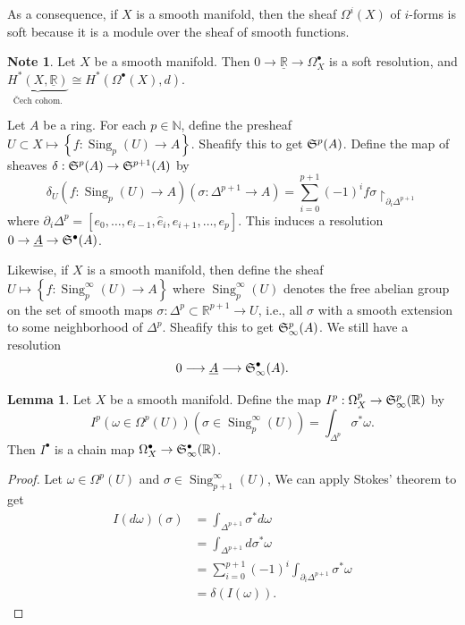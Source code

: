 \documentclass[10pt,letterpaper,cm]{nupset}
\theoremstyle{definition}
\newtheorem{note}[definition]{Note}
\theoremstyle{theorem}
\newtheorem{lemma}[definition]{Lemma}
\theoremstyle{remark}
\newcommand{\N}{\mathbb N}
\newcommand{\R}{\mathbb{R}}
\newcommand{\1}{\mathbb{1}}
\newcommand{\0}{\vec 0}
\DeclareMathOperator{\sing}{Sing}
\begin{document}
As a consequence, if $X$ is a smooth manifold, then the sheaf $\Omega^i(X)$ of $i$-forms is soft because it is a module over the sheaf of smooth functions. 



\begin{note}
Let $X$ be a smooth manifold. Then $0 \to \underline{\R} \to \Omega^{\bullet}_X$ is a soft resolution, and $\underbrace{H^{\ast}(X, \underline{\R})}_{\text{\v{C}ech cohom.}} \cong H^{\ast}(\Omega^{\bullet}(X), d)$.
\end{note}

\medskip


Let $A$ be a ring. For each $p \in \N$, define the presheaf $U\subset X \mapsto \left\{f : \sing_p(U) \to A\right\}$. Sheafify this to get $\frak{S}^p(A)$. Define the map of sheaves $\delta: \frak{S}^p(A)\to \frak{S}^{p+1}(A)$ by $$\delta_U(f : \sing_{p}(U) \to A)(\sigma : \Delta^{p+1} \to A) = \sum_{i=0}^{p+1} ({-1})^i f{\sigma \restriction_{\partial_i{\Delta^{p+1}}}}    $$ where $\partial_i{\Delta^p} = \left[e_0, \ldots, e_{i-1}, \hat{e}_i, e_{i+1}, \ldots, e_p\right]$. This induces a resolution $0 \to \underline{A} \to \frak{S}^{\bullet}(A)$.

Likewise, if $X$ is a smooth manifold, then define the sheaf $U \mapsto \left\{f : \sing_p^{\infty}(U) \to A\right\}$ where $\sing_p^{\infty}(U)$ denotes the free abelian group on the set of smooth maps $\sigma: \Delta^p\subset \R^{p+1} \to U$, i.e., all $\sigma$ with a smooth extension to some neighborhood of $\Delta^p$. Sheafify this to get $\frak{S}_{\infty}^p(A)$. We still have a resolution $$0 \longrightarrow \underline{A}  \longrightarrow \frak{S}_{\infty}^{\bullet}(A).$$


\begin{lemma} 
Let $X$ be a smooth manifold. Define the map $I^p: \Omega^{p}_{X} \to \frak{S}^{p}_{\infty}(\R)$ by $$I^p(\omega \in \Omega^p(U))(\sigma \in \sing_p^{\infty}(U)) = \int_{\Delta^p} \sigma^{\ast}{\omega}.$$ 
 Then $I^{\bullet}$ is a chain map  $\Omega^{\bullet}_{X} \to \frak{S}^{\bullet}_{\infty}(\R)$.
\end{lemma}
\begin{proof} 
Let $\omega \in \Omega^p(U)$ and $\sigma \in \sing_{p+1}^{\infty}(U)$, We can apply Stokes' theorem to get
\begin{align*}
I(d{\omega})(\sigma) & = \int_{\Delta^{p+1}}\sigma^{\ast}d{\omega}
\\ & = \int_{\Delta^{p+1}}d{\sigma^{\ast}{\omega}}
\\ & = \sum_{i=0}^{p+1}({-1})^i \int_{\partial_i{\Delta^{p+1}}}\sigma^{\ast}{\omega}
\\ & = \delta(I(\omega)).
\end{align*}
\end{proof}
\end{document}
